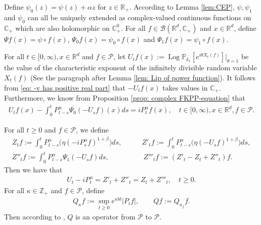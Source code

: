 \documentclass[EJP]{ejpecp} %
\begin{document}
Define $\psi_0(z) = \psi(z) + \alpha z$ for $z\in \mathbb{R}_+$.
According to Lemma \ref{lem:CEP}, $\psi, \psi_1$ and $\psi_0$ can all be uniquely extended as complex-valued continuous functions on $\mathbb C_+$ which are also holomorphic on $\mathbb C^0_+$.
For all $f\in \mathcal B(\mathbb R^d, \mathbb C_+)$ and $x\in \mathbb R^d$, define $\Psi f (x) = \psi\circ f(x)$, $\Psi_0 f(x)= \psi_0 \circ f(x)$ and $\Psi_1 f(x)= \psi_1 \circ f(x)$.

For all $t\in [0,\infty), x\in \mathbb R^d $ and $f \in \mathcal{P}$, let $ U_tf(x) := \operatorname{Log} \mathbb P_{\delta_x}[e^{i\theta X_t(f)}]|_{\theta = 1} $ be the value of the characteristic exponent of the infinitely divisible random variable $X_t(f)$ (See the paragraph after Lemma \ref{lem: Lip of power function}).
It follows from \eqref{eq: -v has positive real part} that $-U_tf(x)$ takes values in $\mathbb C_+$. Furthermore, we know from Proposition \ref{prop: complex FKPP-equation} that
\begin{align}
  \label{eq:chareq2}
  U_tf(x) - \int_0^t P^\alpha_{t-s} \Psi_0(-U_sf)(x)ds
  = i P^{\alpha}_t f(x)
  , \quad t\in [0,\infty), x\in \mathbb{R}^d, f\in \mathcal P.
\end{align}

For all $t\geq 0$ and $f\in \mathcal P$, we define
\begin{align}
  \label{eq: def of Zf}
  Z_t f
  := \int_0^t P^\alpha_{t-s}\big( \eta (-i P^\alpha_sf)^{1+\beta}\big)ds,
  & \qquad Z'_t f
    := \int_0^t P^\alpha_{t-s}\big( \eta (-U_s f)^{1+\beta}\big)ds,
  \\ Z''_t f
  := \int_0^t P^\alpha_{t-s}\Psi_1(-U_s f)ds,
  & \qquad\  Z'''_t f
    := (Z'_t - Z_t+ Z''_t)f.
\end{align}
Then we have that
\begin{align}
  \label{eq: key equality}
  U_t - i P^\alpha_t
  = Z'_t + Z''_t
  = Z_t + Z'''_t
  , \quad t\geq 0.
\end{align}
For all $\kappa \in \mathbb Z_+$ and $f\in \mathcal P$, define
\begin{align}
  \label{eq:Q}
  Q_\kappa f
  := \sup_{t\geq 0} e^{\kappa b t}|P_t f|,
  \qquad  Q f
  := Q_{\kappa_f}f.
\end{align}
Then according to \cite[Fact 1.2]{MarksMilos2018CLT}, $Q$ is an operator from $\mathcal P$ to $\mathcal P$.
\end{document}

